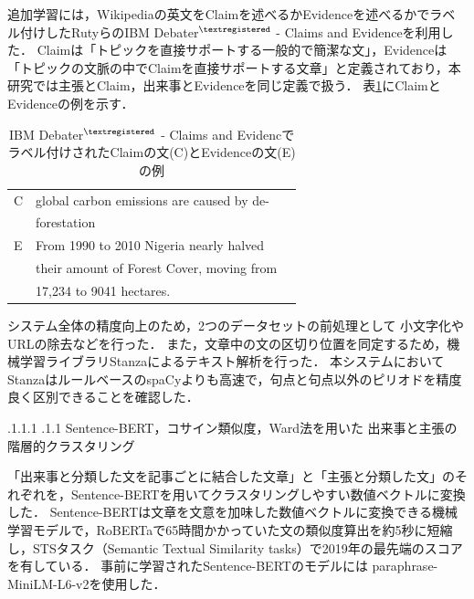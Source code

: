 \documentclass[a4paper, twocolumn, 10pt]{jarticle}
\makeatletter
\def\subsection{%
	\@startsection{subsection}{1}{\z@}%
	{.1\Cvs \@plus.1\Cdp \@minus.1\Cdp}%
	{.1\Cvs \@plus.1\Cdp}%
	{\normalfont\normalsize\bfseries}%
}
\makeatother
\begin{document}
追加学習には，Wikipediaの英文をClaimを述べるかEvidenceを述べるかでラベル付けしたRutyらのIBM Debater$^{\textregistered}$ - Claims and Evidenceを利用した\cite{rinott_show_2015}．
Claimは「トピックを直接サポートする一般的で簡潔な文」，Evidenceは「トピックの文脈の中でClaimを直接サポートする文章」と定義されており，本研究では主張とClaim，出来事とEvidenceを同じ定義で扱う．
表\ref{claim_evidence_example}にClaimとEvidenceの例を示す．

\begin{table}[h]
  \caption{IBM Debater$^{\textregistered}$ - Claims and Evidencでラベル付けされたClaimの文(C)とEvidenceの文(E)の例}
  \centering
  \begin{tabular}{llp{6cm}}
    \hline
    C & global carbon emissions are caused by de-
    \\
    & forestation
    \\
    E & From 1990 to 2010 Nigeria nearly halved
    \\
    & their amount of Forest Cover, moving from
    \\
    & 17,234 to 9041 hectares.
    \\
    \hline
  \end{tabular}
  \label{claim_evidence_example}
\end{table}

システム全体の精度向上のため，2つのデータセットの前処理として
小文字化やURLの除去などを行った．
また，文章中の文の区切り位置を同定するため，機械学習ライブラリStanzaによるテキスト解析を行った\cite{qi_stanza_2020}．
本システムにおいてStanzaはルールベースのspaCyよりも高速で，句点と句点以外のピリオドを精度良く区別できることを確認した．



\subsection{
Sentence-BERT，コサイン類似度，Ward法を用いた
出来事と主張の
階層的クラスタリング
}

「出来事と分類した文を記事ごとに結合した文章」と「主張と分類した文」のそれぞれを，Sentence-BERTを用いてクラスタリングしやすい数値ベクトルに変換した．
Sentence-BERTは文章を文意を加味した数値ベクトルに変換できる機械学習モデルで，RoBERTaで65時間かかっていた文の類似度算出を約5秒に短縮し，STSタスク（Semantic Textual Similarity tasks）で2019年の最先端のスコアを有している\cite{reimers_sentence-bert_2019}．
事前に学習されたSentence-BERTのモデルには
paraphrase-MiniLM-L6-v2を使用した．
\end{document}
